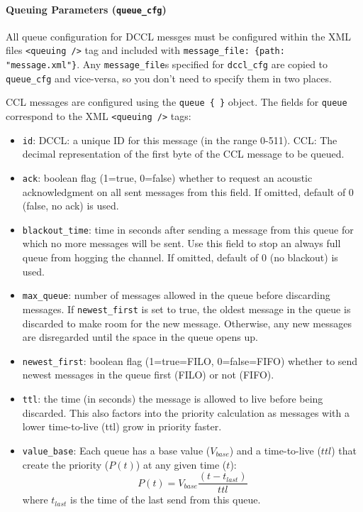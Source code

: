 \documentclass[11pt, letterpaper, oneside]{memoir}
\begin{document}
\paragraph{Queuing Parameters (\texttt{queue\_cfg})} \label{sec:xmlqueue}
All queue configuration for DCCL messges must be configured within the XML files \verb|<queuing />| tag and included with \verb|message_file: {path: "message.xml"}|. Any \verb|message_file|s specified for \verb|dccl_cfg| are copied to \verb|queue_cfg| and vice-versa, so you don't need to specify them in two places.

CCL messages are configured using the \verb|queue { }| object. The fields for \verb|queue| correspond to the XML \verb|<queuing />| tags:
\begin{itemize}
\item \verb|id|: DCCL: a unique ID for this message (in the range 0-511). CCL: The decimal representation of the first byte of the CCL message to be queued. 
\item \verb|ack|: boolean flag (1=true, 0=false) whether to request an
  acoustic acknowledgment on all sent messages from this field. If
  omitted, default of 0 (false, no ack) is used.
\item \verb|blackout_time|: time in seconds after sending a message
  from this queue for which no more messages will be sent. Use this
  field to stop an always full queue from hogging the channel. If
  omitted, default of 0 (no blackout) is used.
\item \verb|max_queue|: number of messages allowed in the queue before
  discarding messages. If \verb|newest_first| is set to true, the
  oldest message in the queue is discarded to make room for the new
  message. Otherwise, any new messages are disregarded until the space
  in the queue opens up.
\item \verb|newest_first|: boolean flag (1=true=FILO, 0=false=FIFO)
  whether to send newest messages in the queue first (FILO) or not
  (FIFO).
\item \verb|ttl|: the time (in seconds) the message is allowed to live before being discarded. This also factors into the priority calculation as messages with a lower time-to-live (ttl) grow in priority faster. 
\item \verb|value_base|: 
Each queue has a base value ($V_{base}$) and a time-to-live ($ttl$) that create the priority ($P(t)$) at any given time ($t$):
 \[
P(t) = V_{base} \frac{(t-t_{last})}{ttl}
 \]
 where $t_{last}$ is the time of the last send from this queue.


\end{itemize}
\end{document}
